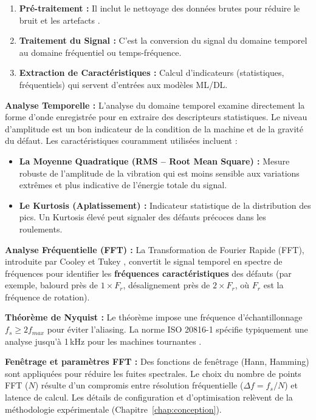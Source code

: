 \begin{enumerate}
\item \textbf{Pré-traitement :} Il inclut le nettoyage des données brutes pour réduire le bruit et les artefacts \cite{bagri2024}.
\item \textbf{Traitement du Signal :} C'est la conversion du signal du domaine temporel au domaine fréquentiel ou temps-fréquence.
\item \textbf{Extraction de Caractéristiques :} Calcul d'indicateurs (statistiques, fréquentiels) qui servent d'entrées aux modèles ML/DL.
\end{enumerate}

\textbf{Analyse Temporelle :} L'analyse du domaine temporel examine directement la forme d'onde enregistrée pour en extraire des descripteurs statistiques. Le niveau d'amplitude est un bon indicateur de la condition de la machine et de la gravité du défaut. Les caractéristiques couramment utilisées incluent :
\begin{itemize}
\item \textbf{La Moyenne Quadratique (RMS -- Root Mean Square) :} Mesure robuste de l'amplitude de la vibration qui est moins sensible aux variations extrêmes et plus indicative de l'énergie totale du signal.
\item \textbf{Le Kurtosis (Aplatissement) :} Indicateur statistique de la distribution des pics. Un Kurtosis élevé peut signaler des défauts précoces dans les roulements.
\end{itemize}

\textbf{Analyse Fréquentielle (FFT) :} La Transformation de Fourier Rapide (FFT), introduite par Cooley et Tukey \cite{cooley1965}, convertit le signal temporel en spectre de fréquences pour identifier les \textbf{fréquences caractéristiques} des défauts (par exemple, balourd près de $1 \times F_r$, désalignement près de $2 \times F_r$, où $F_r$ est la fréquence de rotation).

\textbf{Théorème de Nyquist :} Le théorème impose une fréquence d'échantillonnage $f_s \geq 2f_{max}$ pour éviter l'aliasing. La norme ISO 20816-1 spécifie typiquement une analyse jusqu'à 1\,kHz pour les machines tournantes \cite{iso20816-1}.

\textbf{Fenêtrage et paramètres FFT :} Des fonctions de fenêtrage (Hann, Hamming) sont appliquées pour réduire les fuites spectrales. Le choix du nombre de points FFT ($N$) résulte d'un compromis entre résolution fréquentielle ($\Delta f = f_s/N$) et latence de calcul. Les détails de configuration et d'optimisation relèvent de la méthodologie expérimentale (Chapitre~\ref{chap:conception}).

